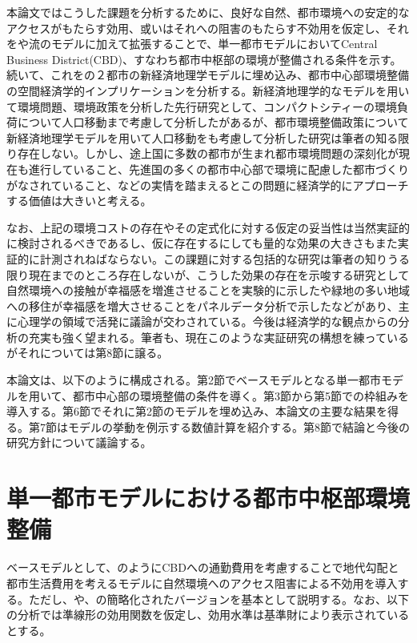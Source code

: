 \documentclass[a4paper]{jarticle}
\begin{document}
本論文ではこうした課題を分析するために、良好な自然、都市環境への安定的なアクセスがもたらす効用、或いはそれへの阻害のもたらす不効用を仮定し、それを\citet{tabuchi98:urba}や\citet{ottaviano02:aggl}流のモデルに加えて拡張することで、単一都市モデルにおいてCentral Business District(CBD)、すなわち都市中枢部の環境が整備される条件を示す。続いて、これを\citet{ottaviano02:aggl}の２都市の新経済地理学モデルに埋め込み、都市中心部環境整備の空間経済学的インプリケーションを分析する。新経済地理学的なモデルを用いて環境問題、環境政策を分析した先行研究として、コンパクトシティーの環境負荷について人口移動まで考慮して分析した\citet{gaigne12:arec}があるが、都市環境整備政策について新経済地理学モデルを用いて人口移動をも考慮して分析した研究は筆者の知る限り存在しない。しかし、途上国に多数の都市が生まれ都市環境問題の深刻化が現在も進行していること、先進国の多くの都市中心部で環境に配慮した都市づくりがなされていること、などの実情を踏まえるとこの問題に経済学的にアプローチする価値は大きいと考える。

なお、上記の環境コストの存在やその定式化に対する仮定の妥当性は当然実証的に検討されるべきであるし、仮に存在するにしても量的な効果の大きさもまた実証的に計測されねばならない。この課題に対する包括的な研究は筆者の知りうる限り現在までのところ存在しないが、こうした効果の存在を示唆する研究として自然環境への接触が幸福感を増進させることを実験的に示した\citet{berman08:cogn}や緑地の多い地域への移住が幸福感を増大させることをパネルデータ分析で示した\citet{alcock14:long}などがあり、主に心理学の領域で活発に議論が交わされている。今後は経済学的な観点からの分析の充実も強く望まれる。筆者も、現在このような実証研究の構想を練っているがそれについては第8節に譲る。

本論文は、以下のように構成される。第2節でベースモデルとなる単一都市モデルを用いて、都市中心部の環境整備の条件を導く。第3節から第5節で\citet{ottaviano02:aggl}の枠組みを導入する。第6節でそれに第2節のモデルを埋め込み、本論文の主要な結果を得る。第7節はモデルの挙動を例示する数値計算を紹介する。第8節で結論と今後の研究方針について議論する。

\section{単一都市モデルにおける都市中枢部環境整備}
ベースモデルとして、\citet{tabuchi98:urba}のようにCBDへの通勤費用を考慮することで地代勾配と都市生活費用を考えるモデルに自然環境へのアクセス阻害による不効用を導入する。ただし、\citet{ottaviano02:aggl}や\citet{combes08:econ}、\citet{sato11:spat}の簡略化されたバージョンを基本として説明する。なお、以下の分析では準線形の効用関数を仮定し、効用水準は基準財により表示されているとする。
\end{document}
